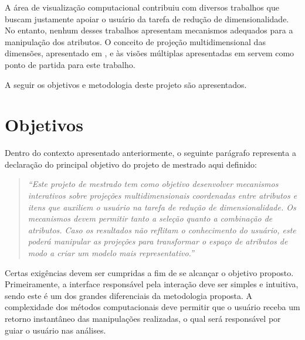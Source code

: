 
A área de visualização computacional contribuiu com diversos trabalhos que buscam justamente apoiar o usuário da tarefa de redução de dimensionalidade. No entanto, nenhum desses trabalhos apresentam mecanismos adequados para a manipulação dos atributos. O conceito de projeção multidimensional das dimensões, apresentado em \cite{Yang2007}, e às visões múltiplas apresentadas em \cite{Turkay2011} servem como ponto de partida para este trabalho.

A seguir os objetivos e metodologia deste projeto são apresentados.


\section{Objetivos}

Dentro do contexto apresentado anteriormente, o seguinte parágrafo representa a declaração do principal objetivo do projeto de mestrado aqui definido:

\begin{quote}
  \emph{``Este projeto de mestrado tem como objetivo desenvolver mecanismos interativos sobre projeções multidimensionais coordenadas entre atributos e itens que auxiliem o usuário na tarefa de redução de dimensionalidade. Os mecanismos devem permitir tanto a seleção quanto a combinação de atributos. Caso os resultados não reflitam o conhecimento do usuário, este poderá manipular as projeções para transformar o espaço de atributos de modo a criar um modelo mais representativo.''}
\end{quote}

Certas exigências devem ser cumpridas a fim de se alcançar o objetivo proposto. Primeiramente, a interface responsável pela interação deve ser simples e intuitiva, sendo este é um dos grandes diferenciais da metodologia proposta. A complexidade dos métodos computacionais deve permitir que o usuário receba um retorno instantâneo das manipulações realizadas, o qual será responsável por guiar o usuário nas análises. 

